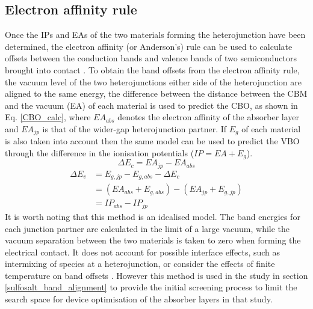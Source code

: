 \documentclass[11pt, twoside]{report}
\begin{document}
\subsection{Electron affinity rule}
Once the IPs and EAs of the two materials forming the heterojunction have been determined, the electron affinity (or Anderson's) rule can be used to calculate offsets between the conduction bands and valence bands of two semiconductors brought into contact \cite{Anderson_rule, keith_contacts}.
To obtain the band offsets from the electron affinity rule, the vacuum level of the two heterojunctions either side of the heterojunction are aligned to the same energy, the difference between the distance between the CBM and the vacuum (EA) of each material is used to predict the CBO, as shown in Eq. \ref{CBO_calc}, where $EA_{abs}$ denotes the electron affinity of the absorber layer and $EA_{jp}$ is that of the wider-gap heterojunction partner. If $E_g$ of each material is also taken into account then the same model can be used to predict the VBO through the difference in the ionisation potentials ($IP = EA + E_g$). 
\begin{equation}\label{CBO_calc}
\Delta E_c = EA_{jp} - EA_{abs}
\end{equation}
\begin{equation}\label{VBO_calc}
\begin{aligned}
\Delta E_v & = E_{g,jp} - E_{g,abs} - \Delta E_c \\
& = (EA_{abs }+ E_{g, abs}) - (EA_{jp} + E_{g,jp}) \\
& = IP_{abs} - IP_{jp}
\end{aligned}
\end{equation}
It is worth noting that this method is an idealised model. The band energies for each junction partner are calculated in the limit of a large vacuum, while the vacuum separation between the two materials is taken to zero when forming the electrical contact. It does not account for possible interface effects, such as intermixing of species at a heterojunction, or consider the effects of finite temperature on band offsets \cite{Bartomeu_T_effects}. However this method is used in the study in section \ref{sulfosalt_band_alignment} to provide the initial screening process to limit the search space for device optimisation of the absorber layers in that study.
\end{document}
